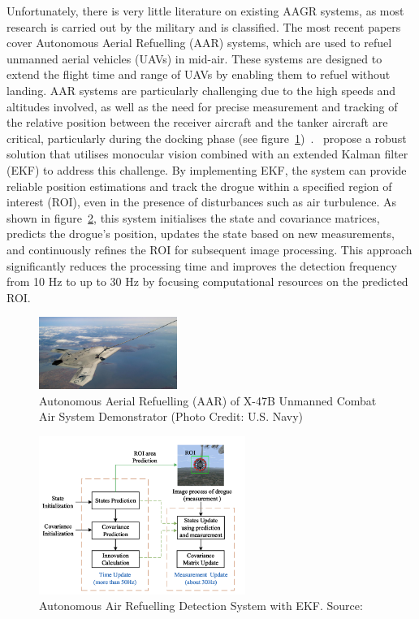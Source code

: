 \documentclass[12pt,oneside]{book} %
\begin{document}
\newpage

Unfortunately, there is very little literature on existing AAGR systems, as
most research is carried out by the military and is classified. The most recent
papers cover Autonomous Aerial Refuelling (AAR) systems, which are used to
refuel unmanned aerial vehicles (UAVs) in mid-air. These systems are designed
to extend the flight time and range of UAVs by enabling them to refuel without
landing. AAR systems are particularly challenging due to the high speeds and
altitudes involved, as well as the need for precise measurement and tracking of
the relative position between the receiver aircraft and the tanker aircraft are
critical, particularly during the docking phase (see
figure~\ref{fig:aerial-refuelling})~\cite{AARBinocularVision,
    AARCNN}.~\citet{AAREKF} propose a robust solution that utilises monocular
vision combined with an extended Kalman filter (EKF) to address this challenge.
By implementing EKF, the system can provide reliable position estimations and
track the drogue within a specified region of interest (ROI), even in the
presence of disturbances such as air turbulence. As shown in
figure~\ref{fig:detection-system-aarekf}, this system initialises the state and
covariance matrices, predicts the drogue's position, updates the state based on
new measurements, and continuously refines the ROI for subsequent image
processing. This approach significantly reduces the processing time and
improves the detection frequency from 10 Hz to up to 30 Hz by focusing
computational resources on the predicted ROI. 

\begin{figure}[H]
    \centering
    \includegraphics[width=0.4\textwidth]{figures/x-47brefueling.jpg}
    \caption{Autonomous Aerial Refuelling (AAR) of X-47B Unmanned Combat Air System Demonstrator (Photo Credit: U.S. Navy)}\label{fig:aerial-refuelling}
\end{figure}

\begin{figure}[H]
    \centering
    \includegraphics[width=0.6\textwidth]{figures/detection_system_AAREKF.png}
    \caption{Autonomous Air Refuelling Detection System with EKF. Source: \citet{AAREKF}}\label{fig:detection-system-aarekf}
\end{figure}
\end{document}
